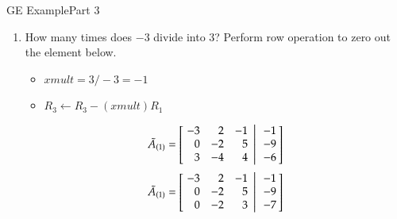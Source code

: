 \documentclass[10pt]{beamer}
\begin{document}
\begin{frame}{GE Example}{Part 3}
\begin{enumerate}

    \item[4.] How many times does $\boxed{-3}$ divide into $3$? Perform row operation to zero out the element below.
    \begin{itemize}
        \item $xmult =3/-3=-1$
        \item $R_3\leftarrow R_3-(xmult)R_1$
    \end{itemize}
    \begin{equation*}
    \tilde{A}_{(1)} = \left[
           \left.\negthickspace\begin{array}{rrr}  -3 &  2 & -1 \\
                                                    0 & -2 &  5 \\
                                                    3 & -4 &  4 \end{array}
           \right|\begin{array}{r} -1 \\ -9 \\ -6 \end{array}\negthickspace\right]
\end{equation*}
\begin{equation*}
    \tilde{A}_{(1)} = \left[
           \left.\negthickspace\begin{array}{rrr}  -3 &  2 & -1 \\
                                                    0 & -2 &  5 \\
                                                    0 & -2 &  3 \end{array}
           \right|\begin{array}{r} -1 \\ -9 \\ -7 \end{array}\negthickspace\right]
\end{equation*}
\end{enumerate}
\end{frame}
\end{document}
